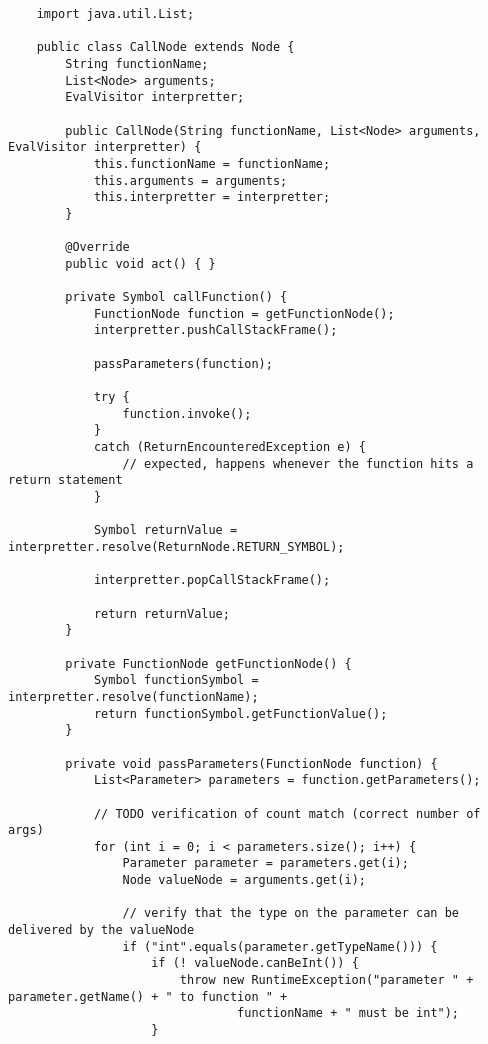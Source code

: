 {\footnotesize
\begin{verbatim}
    import java.util.List;
    
    public class CallNode extends Node {
        String functionName;
        List<Node> arguments;
        EvalVisitor interpretter;
    
        public CallNode(String functionName, List<Node> arguments, EvalVisitor interpretter) {
            this.functionName = functionName;
            this.arguments = arguments;
            this.interpretter = interpretter;
        }
    
        @Override
        public void act() { }
    
        private Symbol callFunction() {
            FunctionNode function = getFunctionNode();
            interpretter.pushCallStackFrame();
    
            passParameters(function);
    
            try {
                function.invoke();
            }
            catch (ReturnEncounteredException e) {
                // expected, happens whenever the function hits a return statement
            }
    
            Symbol returnValue = interpretter.resolve(ReturnNode.RETURN_SYMBOL);
    
            interpretter.popCallStackFrame();
    
            return returnValue;
        }
    
        private FunctionNode getFunctionNode() {
            Symbol functionSymbol = interpretter.resolve(functionName);
            return functionSymbol.getFunctionValue();
        }
    
        private void passParameters(FunctionNode function) {
            List<Parameter> parameters = function.getParameters();
    
            // TODO verification of count match (correct number of args)
            for (int i = 0; i < parameters.size(); i++) {
                Parameter parameter = parameters.get(i);
                Node valueNode = arguments.get(i);
    
                // verify that the type on the parameter can be delivered by the valueNode
                if ("int".equals(parameter.getTypeName())) {
                    if (! valueNode.canBeInt()) {
                        throw new RuntimeException("parameter " + parameter.getName() + " to function " +
                                functionName + " must be int");
                    }
    

\end{verbatim}}
